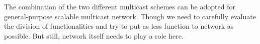 \documentclass[11pt]{article}
\begin{document}
\vspace{1em}
The combination of the two different multicast schemes can be
adopted for general-purpose scalable multicast network. Though we need 
to carefully evaluate the division of functionalities and try to put
as less function to network as possible. But still, network itself
needs to play a role here.


\vspace{1em}
\end{document}
